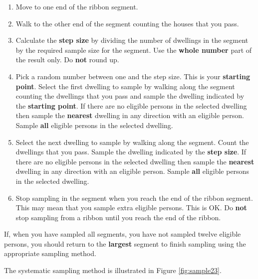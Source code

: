 \documentclass[12pt,a4paper]{book}
\theoremstyle{definition}
\theoremstyle{definition}
\theoremstyle{definition}
\theoremstyle{remark}
\begin{document}
\begin{enumerate}
\def\labelenumi{\arabic{enumi}.}
\item
  Move to one end of the ribbon segment.
\item
  Walk to the other end of the segment counting the houses that you
  pass.
\item
  Calculate the \textbf{step size} by dividing the number of dwellings
  in the segment by the required sample size for the segment. Use the
  \textbf{whole number} part of the result only. Do \textbf{not} round
  up.
\item
  Pick a random number between one and the step size. This is your
  \textbf{starting point}. Select the first dwelling to sample by
  walking along the segment counting the dwellings that you pass and
  sample the dwelling indicated by the \textbf{starting point}. If there
  are no eligible persons in the selected dwelling then sample the
  \textbf{nearest} dwelling in any direction with an eligible person.
  Sample \textbf{all} eligible persons in the selected dwelling.
\item
  Select the next dwelling to sample by walking along the segment. Count
  the dwellings that you pass. Sample the dwelling indicated by the
  \textbf{step size}. If there are no eligible persons in the selected
  dwelling then sample the \textbf{nearest} dwelling in any direction
  with an eligible person. Sample \textbf{all} eligible persons in the
  selected dwelling.
\item
  Stop sampling in the segment when you reach the end of the ribbon
  segment. This may mean that you sample extra eligible persons. This is
  OK. Do \textbf{not} stop sampling from a ribbon until you reach the
  end of the ribbon.
\end{enumerate}

If, when you have sampled all segments, you have not sampled twelve
eligible persons, you should return to the \textbf{largest} segment to
finish sampling using the appropriate sampling method.

The systematic sampling method is illustrated in Figure
\ref{fig:sample23}.
\end{document}
